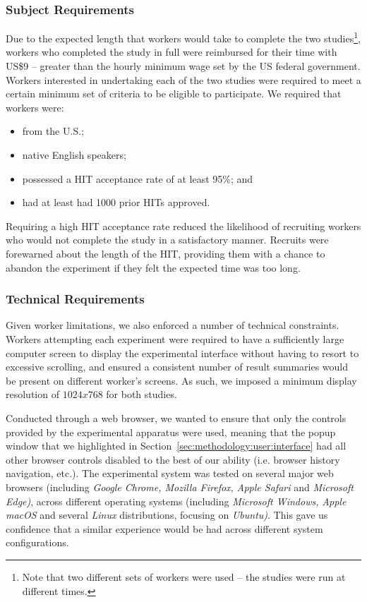 \subsubsection{Subject Requirements}\label{sec:methodology:user:crowdsourcing:subjects}
Due to the expected length that workers would take to complete the two studies\footnote{Note that two different sets of workers were used -- the studies were run at different times.}, workers who completed the study in full were reimbursed for their time with US\$9 -- greater than the hourly minimum wage set by the US federal government. Workers interested in undertaking each of the two studies were required to meet a certain minimum set of criteria to be eligible to participate. We required that workers were:

\begin{itemize}
    \item{from the U.S.;}
    \item{native English speakers;}
    \item{possessed a HIT acceptance rate of at least 95\%; and}
    \item{had at least had 1000 prior HITs approved.}
\end{itemize}

Requiring a high HIT acceptance rate reduced the likelihood of recruiting workers who would not complete the study in a satisfactory manner. Recruits were forewarned about the length of the HIT, providing them with a chance to abandon the experiment if they felt the expected time was too long.

\subsubsection{Technical Requirements}\label{sec:methodology:user:crowdsourcing:technical}
Given worker limitations, we also enforced a number of technical constraints. Workers attempting each experiment were required to have a sufficiently large computer screen to display the experimental interface without having to resort to excessive scrolling, and ensured a consistent number of result summaries would be present on different worker's screens. As such, we imposed a minimum display resolution of $1024x768$ for both studies. 

Conducted through a web browser, we wanted to ensure that only the controls provided by the experimental apparatus were used, meaning that the popup window that we highlighted in Section~\ref{sec:methodology:user:interface} had all other browser controls disabled to the best of our ability (i.e. browser history navigation, etc.). The experimental system was tested on several major web browsers (including \emph{Google Chrome, Mozilla Firefox,} \emph{Apple Safari} and \emph{Microsoft Edge)}, across different operating systems (including \emph{Microsoft Windows,} \emph{Apple macOS} and several \emph{Linux} distributions, focusing on \emph{Ubuntu)}. This gave us confidence that a similar experience would be had across different system configurations.

